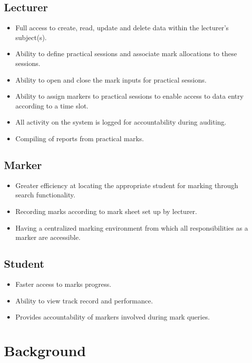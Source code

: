 \documentclass[a4paper]{article}
\begin{document}
		\subsection{Lecturer}
			\begin{itemize}
				\item	Full access to create, read, update and delete data within the lecturer's subject(s).
				\item	Ability to define practical sessions and associate mark allocations to these sessions.
				\item	Ability to open and close the mark inputs for practical sessions.
				\item	Ability to assign markers to practical sessions to enable access to data entry according to a time slot.
				\item	All activity on the system is logged for accountability during auditing.
				\item	Compiling of reports from practical marks.
			\end{itemize}

		\subsection{Marker}
			\begin{itemize}
				\item	Greater efficiency at locating the appropriate student for marking through search functionality.
				\item	Recording marks according to mark sheet set up by lecturer.
				\item	Having a centralized marking environment from which all responsibilities as a marker are accessible.
			\end{itemize}

		\subsection{Student}
			\begin{itemize}
				\item	Faster access to marks progress.
				\item	Ability to view track record and performance.
				\item	Provides accountability of markers involved during mark queries.
			\end{itemize}

	\section{Background}
\end{document}
